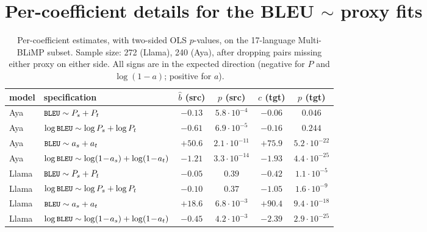 \documentclass[11pt]{article}
\newcommand{\code}[1]{\texttt{\small #1}}
\begin{document}
\section{Per-coefficient details for the BLEU $\sim$ proxy fits}
\label{app:coef}

\begin{table}[h]
\centering
\small
\begin{tabular}{llcccc}
\toprule
model & specification & $\hat b$ (src) & $p$ (src) & $\hat c$ (tgt) & $p$ (tgt) \\
\midrule
Aya   & $\code{BLEU} \sim P_s + P_t$               & $-0.13$ & $5.8\!\cdot\!10^{-4}$ & $-0.06$ & $0.046$ \\
Aya   & $\log\code{BLEU} \sim \log P_s + \log P_t$ & $-0.61$ & $6.9\!\cdot\!10^{-5}$ & $-0.16$ & $0.244$ \\
Aya   & $\code{BLEU} \sim a_s + a_t$               & $+50.6$ & $2.1\!\cdot\!10^{-11}$ & $+75.9$ & $5.2\!\cdot\!10^{-22}$ \\
Aya   & $\log\code{BLEU} \sim \log(1\!-\!a_s) + \log(1\!-\!a_t)$
                                                   & $-1.21$ & $3.3\!\cdot\!10^{-14}$ & $-1.93$ & $4.4\!\cdot\!10^{-25}$ \\
\midrule
Llama & $\code{BLEU} \sim P_s + P_t$               & $-0.05$ & $0.39$    & $-0.42$ & $1.1\!\cdot\!10^{-5}$ \\
Llama & $\log\code{BLEU} \sim \log P_s + \log P_t$ & $-0.10$ & $0.37$    & $-1.05$ & $1.6\!\cdot\!10^{-9}$ \\
Llama & $\code{BLEU} \sim a_s + a_t$               & $+18.6$ & $6.8\!\cdot\!10^{-3}$ & $+90.4$ & $9.4\!\cdot\!10^{-18}$ \\
Llama & $\log\code{BLEU} \sim \log(1\!-\!a_s) + \log(1\!-\!a_t)$
                                                   & $-0.45$ & $4.2\!\cdot\!10^{-3}$ & $-2.39$ & $2.9\!\cdot\!10^{-25}$ \\
\bottomrule
\end{tabular}
\caption{Per-coefficient estimates, with two-sided OLS $p$-values, on
the 17-language Multi-BLiMP subset. Sample size: 272 (Llama), 240
(Aya), after dropping pairs missing either proxy on either side. All
signs are in the expected direction (negative for $P$ and $\log(1-a)$;
positive for $a$).}
\label{tab:coef}
\end{table}
\end{document}
